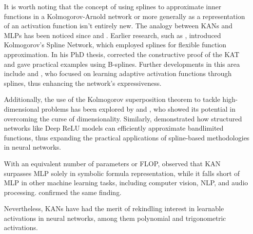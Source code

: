\documentclass{article} %
\theoremstyle{plain}
\theoremstyle{definition}
\theoremstyle{remark}
\begin{document}
It is worth noting that the concept of using splines to approximate inner functions in a Kolmogorov-Arnold network or more generally as a representation of an activation function isn't entirely new. The analogy between KANs and MLPs has been noticed since \cite{hecht1987kolmogorov} and \cite{kuurkova1992kolmogorov}. Earlier research, such as \cite{igelnik2003kolmogorov}, introduced Kolmogorov's Spline Network, which employed splines for flexible function approximation. In his PhD thesis, \citet{braun2009application} corrected the constructive proof of the KAT and gave practical examples using B-splines. Further developments in this area include \cite{bohra2020learning} and \cite{fakhoury2022exsplinet}, who focused on learning adaptive activation functions through splines, thus enhancing the network's expressiveness.

Additionally, the use of the Kolmogorov superposition theorem to tackle high-dimensional problems has been explored by \cite{laczkovich2021superposition} and \cite{lai2021kolmogorov}, who showed its potential in overcoming the curse of dimensionality. Similarly, \cite{montanelli2021deep} demonstrated how structured networks like Deep ReLU models can efficiently approximate bandlimited functions, thus expanding the practical applications of spline-based methodologies in neural networks.

With an equivalent number of parameters or FLOP, \citet{yu2024kan} observed that KAN surpasses MLP solely in symbolic formula representation, while it falls short of MLP in other machine learning tasks, including computer vision, NLP, and audio processing. \citet{cang2024can} confirmed the same finding.%


Nevertheless, KANs have had the merit of rekindling interest in learnable activations in neural networks, among them polynomial and trigonometric activations.
\end{document}
